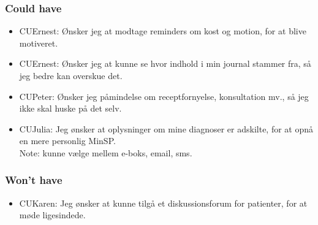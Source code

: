 \subsubsection*{Could have}
\begin{itemize}
\item CUErnest: Ønsker jeg at modtage reminders om kost og motion, for at blive motiveret.
\item CUErnest: Ønsker jeg at kunne se hvor indhold i min journal stammer fra, så jeg bedre kan overskue det.
\item CUPeter: Ønsker jeg påmindelse om receptfornyelse, konsultation mv., så jeg ikke skal huske på det selv.
\item CUJulia: Jeg ønsker at oplysninger om mine diagnoser er adskilte, for at opnå en mere personlig MinSP.\\
Note: kunne vælge mellem e-boks, email, sms.
\end{itemize}
\subsubsection*{Won't have}
\begin{itemize}
\item CUKaren: Jeg ønsker at kunne tilgå et diskussionsforum for patienter, for at møde ligesindede.
\end{itemize}